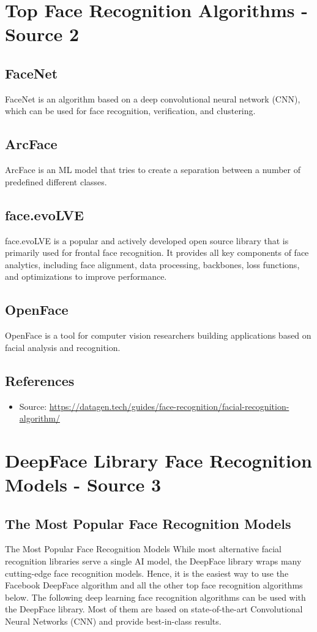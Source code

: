 \documentclass[11pt]{article}
\begin{document}
\section*{Top Face Recognition Algorithms - Source 2}

\subsection*{FaceNet}
FaceNet is an algorithm based on a deep convolutional neural network (CNN), which can be used for face recognition, verification, and clustering.


\subsection*{ArcFace}
ArcFace is an ML model that tries to create a separation between a number of predefined different classes. 

\subsection*{face.evoLVE}
face.evoLVE is a popular and actively developed open source library that is primarily used for frontal face recognition. It provides all key components of face analytics, including face alignment, data processing, backbones, loss functions, and optimizations to improve performance.


\subsection*{OpenFace}
OpenFace is a tool for computer vision researchers building applications based on facial analysis and recognition.


\subsection*{References}
\begin{itemize}
    \item Source: \url{https://datagen.tech/guides/face-recognition/facial-recognition-algorithm/}
\end{itemize}


\section*{DeepFace Library Face Recognition Models - Source 3}

\subsection*{The Most Popular Face Recognition Models}
The Most Popular Face Recognition Models While most alternative facial recognition libraries serve a single AI model, the DeepFace library wraps many cutting-edge face recognition models. Hence, it is the easiest way to use the Facebook DeepFace algorithm and all the other top face recognition algorithms below. The following deep learning face recognition algorithms can be used with the DeepFace library. Most of them are based on state-of-the-art Convolutional Neural Networks (CNN) and provide best-in-class results.
\end{document}
